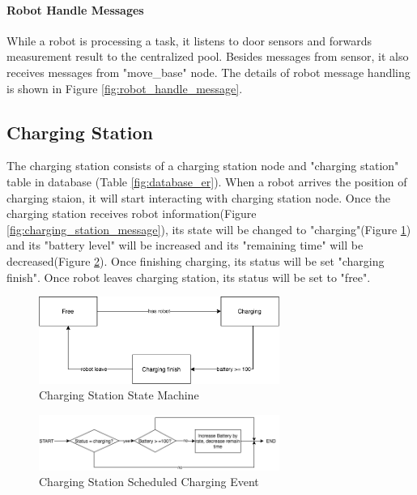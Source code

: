 \paragraph{Robot Handle Messages}
While a robot is processing a task, it listens to door sensors and forwards measurement result to the centralized pool. 
Besides messages from sensor, it also receives messages from "move\_base" node. The details of robot message handling is shown in Figure \ref{fig:robot_handle_message}.

\subsection{Charging Station}
\label{sec:charging_station}
The charging station consists of a charging station node and "charging station" table in database (Table \ref{fig:database_er}). 
When a robot arrives the position of charging staion, it will start interacting with charging station node. Once the charging station receives robot information(Figure \ref{fig:charging_station_message}), its state will be changed to "charging"(Figure \ref{fig:charging_station_state_machine}) and its "battery level" will be increased and its "remaining time" will be decreased(Figure \ref{fig:charging_station_event}).  
Once finishing charging, its status will be set "charging finish". Once robot leaves charging station, its status will be set to "free". 


\begin{figure}[htbp]
    \centering
    \includegraphics[width = 0.7\textwidth]{content/images/ch4/charging_station_state_machine.drawio.png}
    \caption{Charging Station State Machine}
    \label{fig:charging_station_state_machine}
\end{figure}

\begin{figure}[htbp]
    \centering
    \includegraphics[width = 0.7\textwidth]{content/images/ch4/charging_station_charging_event.drawio.png}
    \caption{Charging Station Scheduled Charging Event}
    \label{fig:charging_station_event}
\end{figure}

